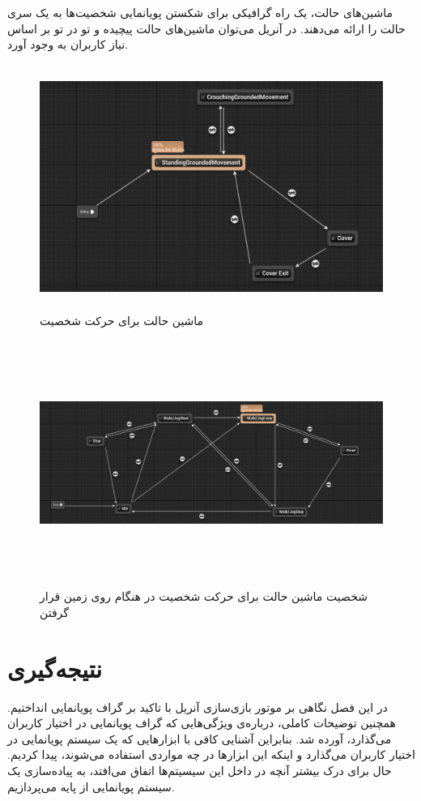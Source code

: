 ماشین‌های حالت، یک راه گرافیکی برای شکستن پویانمایی 
شخصیت‌ها به یک سری حالت را ارائه می‌دهند.
در آنریل می‌توان ماشین‌های حالت پیچیده و تو در تو بر اساس نیاز کاربران به وجود آورد.


\begin{figure}[ht]
	\centerline{\includegraphics[width=\textwidth,height=8cm,keepaspectratio]{Figures/Ch3/AnimationStateMachine1.png}}\hfill
	\caption{ ماشین حالت برای حرکت شخصیت }
	\label{fig:AnimationStateMachine1}
\end{figure}

\begin{figure}[ht]
	\centerline{\includegraphics[width=\textwidth,height=8cm,keepaspectratio]{Figures/Ch3/AnimationStateMachine3.png}}\hfill
	\caption{ شخصیت ماشین حالت برای حرکت شخصیت در هنگام روی زمین قرار گرفتن  }
	\label{fig:AnimationStateMachine3}
\end{figure}

\section{نتیجه‌گیری}

در این فصل نگاهی بر موتور بازی‌سازی آنریل با تاکید بر گراف پویانمایی انداختیم.
همچنین توضیحات کاملی، درباره‌ی ویژگی‌هایی که گراف پویانمایی در اختیار کاربران می‌گذارد، آورده شد.
بنابراین آشنایی کافی با ابزار‌هایی که یک سیستم پویانمایی در اختیار کاربران می‌گذارد و 
اینکه این ابزارها در چه مواردی استفاده می‌شوند، پیدا کردیم.
حال برای درک بیشتر آنچه در داخل این سیسیتم‌ها اتفاق می‌افتد، به پیاده‌سازی یک سیستم پویانمایی از پایه می‌پردازیم.



